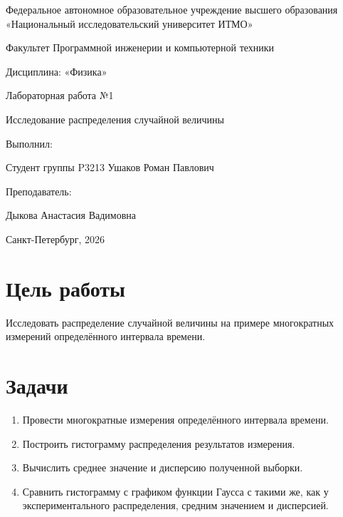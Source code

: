 \documentclass[a4paper,14pt]{extarticle}
\begin{document}
	
	\begin{titlepage}
		\centering
		{\large Федеральное автономное образовательное учреждение высшего образования «Национальный исследовательский университет ИТМО»}
		
		\vspace{1cm}
		
		{\large Факультет Программной инженерии и компьютерной техники}
		
		\vspace{2cm}
		
		{\large Дисциплина: «Физика»}
		
		\vspace{0.5cm}
		
		{\large Лабораторная работа №1}
		
		{\large Исследование распределения случайной величины}
		
		\vfill
		
		\raggedleft
		{\large Выполнил:}
		
		{\large Студент группы P3213 Ушаков Роман Павлович}
		
		\vspace{0.5cm}
		
		{\large Преподаватель:}
		
		{\large Дыкова Анастасия Вадимовна}
		
		\vspace{4.5cm}
		
		\centering
		\large Санкт-Петербург, 2026
	\end{titlepage}
	\setcounter{page}{2}
	
	\tableofcontents
	\newpage
	
	\section{Цель работы}
	Исследовать распределение случайной величины на примере многократных измерений определённого интервала времени.

	\section{Задачи}
	\begin{enumerate}
		\item Провести многократные измерения определённого интервала времени.
		\item Построить гистограмму распределения результатов измерения.
		\item Вычислить среднее значение и дисперсию полученной выборки.
		\item Сравнить гистограмму с графиком функции Гаусса с такими же, как у экспериментального распределения, средним значением и дисперсией.
	\end{enumerate}
\end{document}
